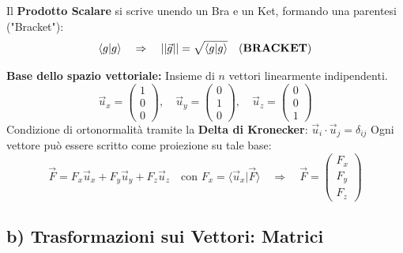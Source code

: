 \documentclass[11pt, a4paper]{article}
\begin{document}
Il \textbf{Prodotto Scalare} si scrive unendo un Bra e un Ket, formando una parentesi ("Bracket"): %
\begin{equation}
    \langle g | g \rangle \quad \Rightarrow \quad ||\vec{g}|| = \sqrt{\langle g | g \rangle} \quad \text{(\textbf{BRACKET})} %
\end{equation}

\textbf{Base dello spazio vettoriale:} Insieme di $n$ vettori linearmente indipendenti. %
\begin{equation*}
    \vec{u}_x = \begin{pmatrix} 1 \\ 0 \\ 0 \end{pmatrix} , \quad \vec{u}_y = \begin{pmatrix} 0 \\ 1 \\ 0 \end{pmatrix} , \quad \vec{u}_z = \begin{pmatrix} 0 \\ 0 \\ 1 \end{pmatrix} %
\end{equation*}
Condizione di ortonormalità tramite la \textbf{Delta di Kronecker}: $\vec{u}_i \cdot \vec{u}_j = \delta_{ij}$ %
Ogni vettore può essere scritto come proiezione su tale base: %
\begin{equation*}
    \vec{F} = F_x \vec{u}_x + F_y \vec{u}_y + F_z \vec{u}_z \quad \text{con } F_x = \langle \vec{u}_x | \vec{F} \rangle \quad \Rightarrow \quad \vec{F} = \begin{pmatrix} F_x \\ F_y \\ F_z \end{pmatrix} %
\end{equation*}

\subsection{b) Trasformazioni sui Vettori: Matrici} %
\end{document}
